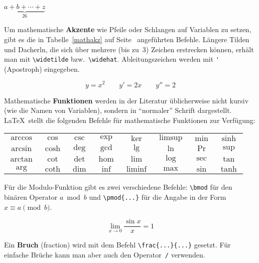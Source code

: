 \begin{LTXexample}
$\underbrace{a+b+\cdots+z}_{26}$
\end{LTXexample}

 
Um mathematische \textbf{Akzente} wie Pfeile oder Schlangen auf
Variablen zu setzen, gibt es die in Tabelle~\ref{mathakz} auf
Seite~\pageref{mathakz} angeführten Befehle.
Längere Tilden und Dacherln, die sich über mehrere (bis zu~3)
Zeichen erstrecken können, erhält man mit \lstinline|\widetilde|
bzw.\ \lstinline|\widehat|.
Ableitungszeichen werden mit \lstinline|'| (Apostroph) eingegeben.

\begin{LTXexample}
\[
y=x^{2} \qquad y'=2x   \qquad y''=2
\]
\end{LTXexample}

 
Mathematische \textbf{Funktionen} werden in der Literatur
üblicherweise nicht kursiv (wie die Namen von Variablen),
sondern in "`normaler"' Schrift dargestellt.
\LaTeX\ stellt die folgenden Befehle für mathematische
Funktionen zur Verfügung:

\begin{LTXexample}[pos=b]
\begin{tabular}{@{}*{8}{>{$}c<{$}}@{}}
\arccos & \cos  & \csc & \exp & \ker    & \limsup & \min & \sinh \\
\arcsin & \cosh & \deg & \gcd & \lg     & \ln     & \Pr  & \sup  \\
\arctan & \cot  & \det & \hom & \lim    & \log    & \sec & \tan  \\
\arg    & \coth & \dim & \inf & \liminf & \max    & \sin & \tanh \\
\end{tabular}
\end{LTXexample}

Für die Modulo-Funktion gibt es zwei verschiedene Befehle:
\lstinline|\bmod| für den binären Operator \(a \bmod b\) und
\lstinline|\pmod{...}| für die Angabe in der Form \(x\equiv a
\pmod{b}\).
 
\begin{LTXexample}
\[
\lim_{x \to 0} \frac{\sin x}{x}
=1
\]
\end{LTXexample}
 
Ein \textbf{Bruch} (fraction) wird mit dem Befehl
\lstinline|\frac{...}{...}| gesetzt.  Für einfache Brüche kann man
aber auch den Operator~\lstinline|/| verwenden.


